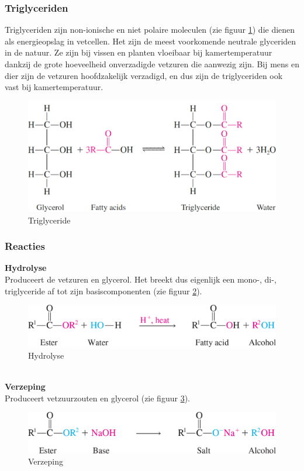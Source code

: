 \documentclass[a4paper,kul]{kulakarticle} %
\begin{document}
\subsubsection{Triglyceriden}
Triglyceriden zijn non-ionische en niet polaire moleculen (zie figuur \ref{fig:triglyceride}) die dienen als energieopslag in vetcellen. Het zijn de meest voorkomende neutrale glyceriden in de natuur. Ze zijn bij vissen en planten vloeibaar bij kamertemperatuur dankzij de grote hoeveelheid onverzadigde vetzuren die aanwezig zijn. Bij mens en dier zijn de vetzuren hoofdzakelijk verzadigd, en dus zijn de triglyceriden ook vast bij kamertemperatuur.
\begin{figure}[h]
	\centering
	\includegraphics[width=0.6\linewidth]{Triglyceride}
	\caption[Triglyceride]{Triglyceride}
	\label{fig:triglyceride}
\end{figure}
\subsubsection{Reacties}
\textbf{Hydrolyse}\\
Produceert de vetzuren en glycerol. Het breekt dus eigenlijk een mono-, di-, triglyceride af tot zijn basiscomponenten (zie figuur \ref{fig:hydrolyseglyceriden}).
\begin{figure}[h]
	\centering
	\includegraphics[width=0.7\linewidth]{HydrolyseGlyceriden}
	\caption[Hydrolyse]{Hydrolyse}
	\label{fig:hydrolyseglyceriden}
\end{figure}\\
\textbf{Verzeping}\\
Produceert vetzuurzouten en glycerol (zie figuur \ref{fig:verzepingglyceriden}).
\begin{figure}[h]
	\centering
	\includegraphics[width=0.7\linewidth]{VerzepingGlyceriden}
	\caption[Verzeping]{Verzeping}
	\label{fig:verzepingglyceriden}
\end{figure}
 \newpage
\end{document}
